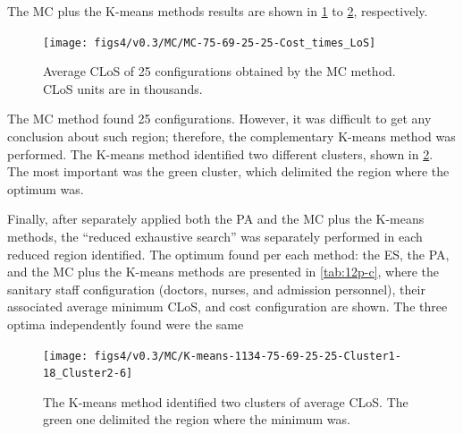 The MC plus the K-means methods results are shown in \ref{subfig:mc12-3}
to \ref{subfig:km12-3}, respectively.
\begin{figure}[H]
\centering{}\texttt{[image: figs4/v0.3/MC/MC-75-69-25-25-Cost\_times\_LoS]}\caption{Average CLoS of 25 configurations obtained by the MC method. CLoS
units are in thousands. \label{subfig:mc12-3}}
\end{figure}
The MC method found 25 configurations. However, it was difficult to
get any conclusion about such region; therefore, the complementary
K-means method was performed. The K-means method identified two different
clusters, shown in \ref{subfig:km12-3}. The most important was the
green cluster, which delimited the region where the optimum was.%

Finally, after separately applied both the PA and the MC plus the
K-means methods, the \textquotedblleft{}reduced exhaustive search\textquotedblright{}
was separately performed in each reduced region identified. The optimum
found per each method: the ES, the PA, and the MC plus the K-means
methods are presented in \ref{tab:12p-c}, where the sanitary staff
configuration (doctors, nurses, and admission personnel), their associated
average minimum CLoS, and cost configuration are shown. The three
optima independently found were the same
\begin{figure}[H]
\begin{centering}
\texttt{[image: figs4/v0.3/MC/K-means-1134-75-69-25-25-Cluster1-18\_Cluster2-6]}
\par\end{centering}

\caption{The K-means method identified two clusters of average CLoS. The green
one delimited the region where the minimum was. \label{subfig:km12-3}}
\end{figure}


